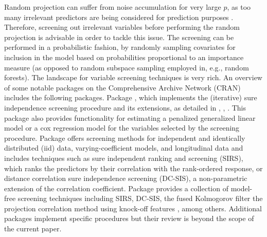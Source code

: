 \documentclass[
  article,
  nojss]{jss}
\begin{document}
Random projection can suffer from noise accumulation for very large
\(p\), as too many irrelevant predictors are being considered for
prediction purposes \citep{Dunson2020TargRandProj}. Therefore, screening
out irrelevant variables before performing the random projection is
advisable in order to tackle this issue. The screening can be performed
in a probabilistic fashion, by randomly sampling covariates for
inclusion in the model based on probabilities proportional to an
importance measure (as opposed to random subspace sampling employed in,
e.g., random forests). The  landscape for variable screening
techniques is very rich. An overview of some notable packages on the
Comprehensive  Archive Network (CRAN) includes the following
packages. Package  \citep{SISR}, which implements the
(iterative) sure independence screening procedure and its extensions, as
detailed in \citet{Fan2007SISforUHD}, \citet{Fan2010sisglms},
\citet{fan2010high}. This package also provides functionality for
estimating a penalized generalized linear model or a cox regression
model for the variables selected by the screening procedure. Package
 \citep{pkg:VariableScreening} offers screening
methods for independent and identically distributed (iid) data,
varying-coefficient models, and longitudinal data and includes
techniques such as sure independent ranking and screening (SIRS), which
ranks the predictors by their correlation with the rank-ordered
response, or distance correlation sure independence screening (DC-SIS),
a non-parametric extension of the correlation coefficient. Package
 \citep{pkg:MFSIS} provides a collection of model-free
screening techniques including SIRS, DC-SIS, the fused Kolmogorov filter
\citep{mai2015fusedkolmogorov} the projection correlation method using
knock-off features \citep{liu2020knockoff}, among others. Additional
packages implement specific procedures but their review is beyond the
scope of the current paper.
\end{document}

